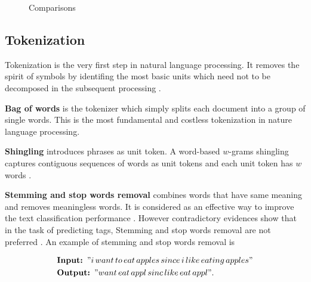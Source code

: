 \documentclass{sig-alternate-05-2015}
\begin{document}
\begin{figure}[t!]
{        \label{fig:balance}
    }
    \quad
    \quad
    \caption{Comparisons}
    \label{fig:all}
\end{figure}

\subsection{Tokenization}

Tokenization is the very first step in natural language processing. It removes the spirit of symbols by identifing the most basic units which need not to be decomposed in the subsequent processing \cite{webster1992tokenization}. 

\textbf{Bag of words} is the tokenizer which simply splits each document into a group of single words. This is the most fundamental and costless tokenization in nature language processing.

\textbf{Shingling} introduces phrases as unit token. A word-based $w$-grams shingling captures contiguous sequences of words as unit tokens and each unit token has $w$ words \cite{chang2009using}.

\textbf{Stemming and stop words removal} combines words that have same meaning and removes meaningless words. It is considered as an effective way to improve the text classification performance \cite{yang1997comparative}. However contradictory evidences show that in the task of predicting tags, Stemming and stop words removal are not preferred \cite{moharanatag,stanley2013predicting}. An example of stemming and stop words removal is

\begin{equation*}
    \begin{aligned}
    &\textbf{Input: }"i\,want\,to\,eat\,apples\,since\,i\,like\,eating\,apples"\\
    &\textbf{Output: }"want\, eat\, appl\, sinc\, like\, eat\, appl".
    \end{aligned}
\end{equation*}
\end{document}

